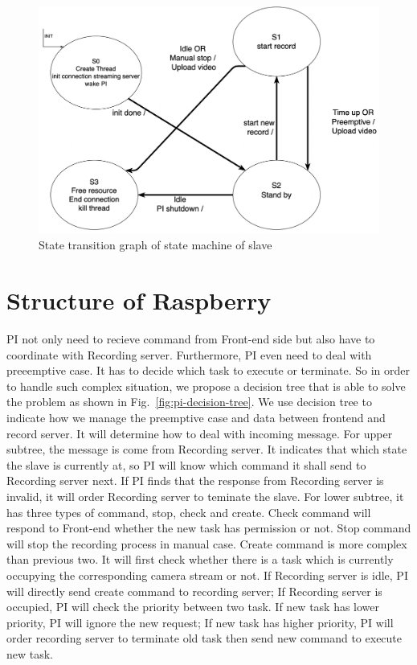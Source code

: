 \begin{figure}[H]
    \centering
    \includegraphics[width=\textwidth]{figsrc/recording-server-stg.png}
    \caption{State transition graph of state machine of slave\label{fig:recording-server-stg}}
\end{figure}

\section{Structure of Raspberry}
PI not only need to recieve command from Front-end side but also have to coordinate with Recording server. Furthermore, PI even need to deal with preeemptive case. It has to decide which task to execute or terminate. So in order to handle such complex situation, we propose a decision tree that is able to solve the problem as shown in Fig.~\ref{fig:pi-decision-tree}. We use decision tree to indicate how we manage the preemptive case and data between frontend and record server. It will determine how to deal with incoming message. For upper subtree, the message is come from Recording server. It indicates that which state the slave is currently at, so PI will know which command it shall send to Recording server next. If PI finds that the response from Recording server is invalid, it will order Recording server to teminate the slave. For lower subtree, it has three types of command, stop, check and create. Check command will respond to Front-end whether the new task has permission or not. Stop command will stop the recording process in manual case. Create command is more complex than previous two. It will first check whether there is a task which is currently occupying the corresponding camera stream or not. If Recording server is idle, PI will directly send create command to recording server; If Recording server is occupied, PI will check the priority between two task. If new task has lower priority, PI will ignore the new request; If new task has higher priority, PI will order recording server to terminate old task then send new command to execute new task.

